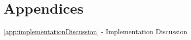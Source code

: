 \documentclass[]{aiaa-tc}%
\begin{document}
\section*{Appendices}
\ref{app:implementationDiscussion} - Implementation Discussion \\

\newpage



\appendix
\pagestyle{empty}



\end{document}

